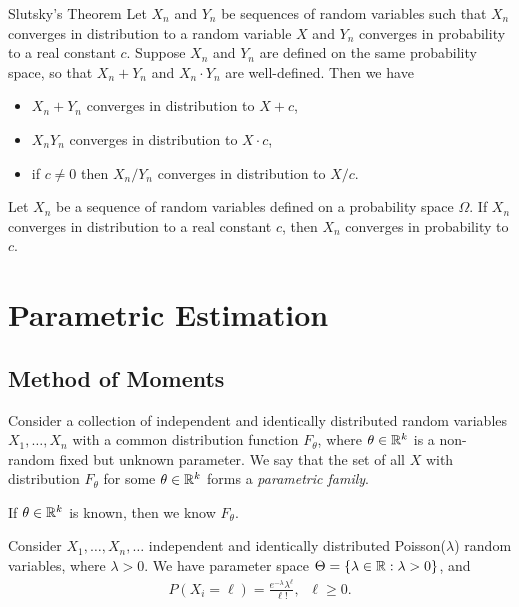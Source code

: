 \begin{thm}{Slutsky's Theorem}\label{slutsky}\proofbreak
    Let $X_n$ and $Y_n$ be sequences of random variables such that $X_n$ converges in distribution to a random variable $X$ and $Y_n$ converges in probability to a real constant $c$. Suppose $X_n$ and $Y_n$ are defined on the same probability space, so that $X_n + Y_n$ and $X_n \cdot Y_n$ are well-defined. Then we have
    \begin{itemize}
        \item $X_n + Y_n$ converges in distribution to $X + c$,
        \item $X_nY_n$ converges in distribution to $X \cdot c$,
        \item if $c \neq 0$ then $X_n / Y_n$ converges in distribution to $X/c$.
    \end{itemize}
\end{thm}

\begin{lemma}
    Let $X_n$ be a sequence of random variables defined on a probability space $\Omega$. If $X_n$ converges in distribution to a real constant $c$, then $X_n$ converges in probability to $c$.
\end{lemma}

\section{Parametric Estimation}

\subsection{Method of Moments}

\begin{defn}
    Consider a collection of independent and identically distributed random variables $X_1, \ldots, X_n$ with a common distribution function $F_{\theta}$, where $\theta \in \mathbb{R}^k$ is a non-random fixed but unknown parameter. We say that the set of all $X$ with distribution $F_{\theta}$ for some $\theta \in \mathbb{R}^k$ forms a \emph{parametric family}.
\end{defn}

\begin{rmk}
    If $\theta \in \mathbb{R}^{k}$ is known, then we know $F_{\theta}$.
\end{rmk}

\begin{exmp}
    Consider $X_1, \ldots, X_n, \ldots$ independent and identically distributed Poisson($\lambda$) random variables, where $\lambda > 0$. We have parameter space $\Theta = \{\lambda \in \mathbb{R}: \lambda > 0\}$, and
    \begin{align*}
        P(X_i = \ell) = \frac{e^{-\lambda}\lambda^{\ell}}{\ell!},\;\;\ell \geq 0.
    \end{align*}
\end{exmp}

